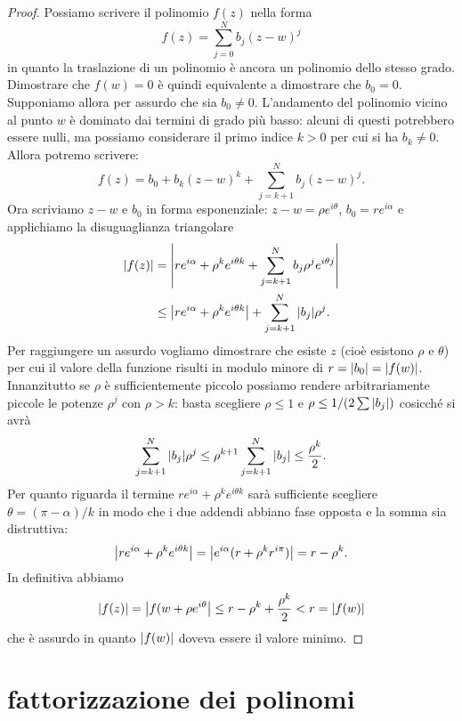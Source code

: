 \begin{proof}
  Possiamo scrivere il polinomio $f(z)$ nella forma
  \[
    f(z) = \sum_{j=0}^N b_j (z-w)^j
  \]
  in quanto la traslazione di un polinomio è ancora un polinomio dello stesso 
  grado.
  Dimostrare che $f(w)=0$ è quindi equivalente a dimostrare che $b_0=0$.
  Supponiamo allora per assurdo che sia $b_0\neq 0$. 
  L'andamento del polinomio vicino al punto $w$ è dominato dai termini di grado 
  più basso: alcuni di questi potrebbero essere nulli, ma possiamo considerare 
  il primo indice $k>0$ per cui si ha $b_k\neq 0$. Allora potremo scrivere:
  \[
      f(z) = b_0 + b_k(z-w)^k + \sum_{j=k+1}^N b_j (z-w)^j.
  \]
Ora scriviamo $z-w$ e $b_0$ in forma esponenziale:
$z - w = \rho e^{i\theta}$, $b_0 = re^{i \alpha}$ 
e applichiamo la disuguaglianza triangolare
  \begin{align*}
    {\left|f(z)\right|} 
    &= {\left|r e^{i\alpha} + \rho^k e^{i\theta k} + \sum_{j=k+1}^N b_j \rho^j e^{i\theta j}\right|} \\
    &\le {\left|r e^{i\alpha} + \rho^k e^{i\theta k}\right|} + \sum_{j=k+1}^N {\left|b_j\right|} \rho^j.
  \end{align*}
Per raggiungere un assurdo vogliamo dimostrare che esiste $z$ (cioè esistono $\rho$ e $\theta$)
per cui il valore della funzione risulti in modulo minore di $r = {\left|b_0\right|} = {\left|f(w)\right|}$.
Innanzitutto se $\rho$ è sufficientemente piccolo possiamo rendere arbitrariamente piccole 
le potenze $\rho^j$ con $\rho>k$: basta scegliere $\rho\le 1$ 
e $\rho \le 1/(2\sum {\left|b_j\right|})$
cosicché si avrà 
\[
  \sum_{j=k+1}^N {\left|b_j\right|} \rho^j
  \le \rho^{k+1} \sum_{j=k+1}^N {\left|b_j\right|} \le \frac{\rho^{k}}{2}.
\]
Per quanto riguarda il termine
$r e^{i\alpha} + \rho^k e^{i\theta k}$ 
sarà sufficiente scegliere $\theta = (\pi -\alpha) /k$ in modo che i due addendi 
abbiano fase opposta e la somma sia distruttiva:
\[
  {\left|r e^{i\alpha} + \rho^k e^{i\theta k}\right|}
  = {\left|e^{i\alpha}(r + \rho^k r^{i\pi})\right|}
  = r - \rho^k.
\]
In definitiva abbiamo
\[
{\left|f(z)\right|} = {\left|f(w+\rho e^{i\theta}\right|} 
\le r - \rho^k + \frac{\rho^k}{2} 
< r = {\left|f(w)\right|}
\]
che è assurdo in quanto ${\left|f(w)\right|}$ doveva essere il valore minimo.
\end{proof}
  
\section{fattorizzazione dei polinomi}

